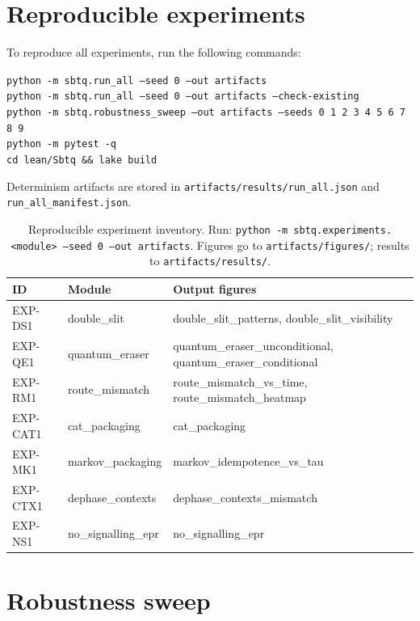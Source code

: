 \documentclass[11pt]{article}
\begin{document}
 \section{Reproducible experiments}\label{app:repro}

To reproduce all experiments, run the following commands:

\noindent\texttt{python -m sbtq.run\_all --seed 0 --out artifacts} \\
\texttt{python -m sbtq.run\_all --seed 0 --out artifacts --check-existing} \\
\texttt{python -m sbtq.robustness\_sweep --out artifacts --seeds 0 1 2 3 4 5 6 7 8 9} \\
\texttt{python -m pytest -q} \\
\texttt{cd lean/Sbtq \&\& lake build}

\medskip
\noindent Determinism artifacts are stored in \texttt{artifacts/results/run\_all.json} and \texttt{run\_all\_manifest.json}.

\begin{table}[t]
  \centering
  \scriptsize
  \setlength{\tabcolsep}{4pt}
  \begin{tabular}{@{}lll@{}}
    \toprule
    ID & Module & Output figures \\
    \midrule
    EXP-DS1 & double\_slit & double\_slit\_patterns, double\_slit\_visibility \\
    EXP-QE1 & quantum\_eraser & quantum\_eraser\_unconditional, quantum\_eraser\_conditional \\
    EXP-RM1 & route\_mismatch & route\_mismatch\_vs\_time, route\_mismatch\_heatmap \\
    EXP-CAT1 & cat\_packaging & cat\_packaging \\
    EXP-MK1 & markov\_packaging & markov\_idempotence\_vs\_tau \\
    EXP-CTX1 & dephase\_contexts & dephase\_contexts\_mismatch \\
    EXP-NS1 & no\_signalling\_epr & no\_signalling\_epr \\
    \bottomrule
  \end{tabular}
  \caption{Reproducible experiment inventory. Run: \texttt{python -m sbtq.experiments.<module> --seed 0 --out artifacts}. Figures go to \texttt{artifacts/figures/}; results to \texttt{artifacts/results/}.}
  \label{tab:experiment-inventory}
\end{table}
 \section{Robustness sweep}\label{app:robustness}
\end{document}
